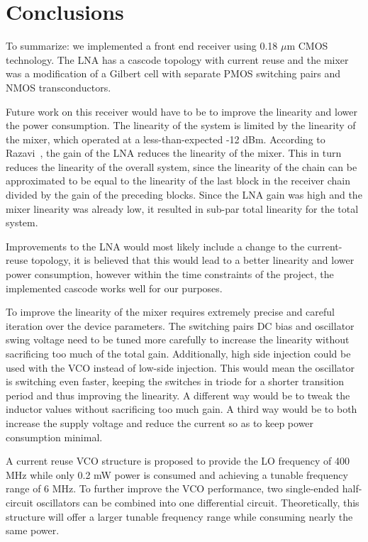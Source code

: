 \section{Conclusions}

To summarize: we implemented a front end receiver using 0.18 $\mu$m CMOS technology. The LNA has a cascode topology with current reuse and the mixer was a modification of a Gilbert cell with separate PMOS switching pairs and NMOS transconductors. 

Future work on this receiver would have to be to improve the linearity and lower the power consumption. The linearity of the system is limited by the linearity of the mixer, which operated at a less-than-expected -12 dBm. According to Razavi~\cite{Razavi}, the gain of the LNA reduces the linearity of the mixer. This in turn reduces the linearity of the overall system, since the linearity of the chain can be approximated to be equal to the linearity of the last block in the receiver chain divided by the gain of the preceding blocks. Since the LNA gain was high and the mixer linearity was already low, it resulted in sub-par total linearity for the total system. 

Improvements to the LNA would most likely include a change to the current-reuse topology, it is believed that this would lead to a better linearity and lower power consumption, however within the time constraints of the project, the implemented cascode works well for our purposes.

To improve the linearity of the mixer requires extremely precise and careful iteration over the device parameters. The switching pairs DC bias and oscillator swing voltage need to be tuned more carefully to increase the linearity without sacrificing too much of the total gain. Additionally, high side injection could be used with the VCO instead of low-side injection. This would mean the oscillator is switching even faster, keeping the switches in triode for a shorter transition period and thus improving the linearity. A different way would be to tweak the inductor values without sacrificing too much gain. A third way would be to both increase the supply voltage and reduce the current so as to keep power consumption minimal.

A current reuse VCO structure is proposed to provide the LO frequency of 400 MHz while only 0.2 mW power is consumed and achieving a tunable frequency range of 6 MHz. To further improve the VCO performance, two single-ended half-circuit oscillators can be combined into one differential circuit. Theoretically, this structure will offer a larger tunable frequency range while consuming nearly the same power.

